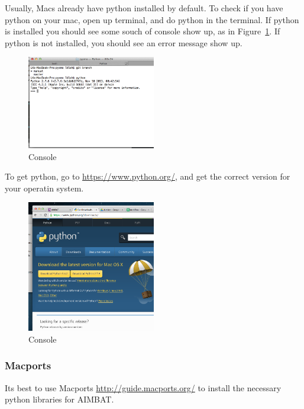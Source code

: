 \documentclass[letterpaper,10pt]{article}
\begin{document}
Usually, Macs already have python installed by default. To check if you have python on your mac,
open up terminal, and do python in the terminal. If python is installed you should see some souch of console show up, as in Figure~\ref{fig:python_console}. If python is not installed, you should see an error message show up. 

\begin{figure}[h!]
  \centering
  \includegraphics[width=0.5\textwidth]{images/python_console}
  \caption{Console}
  \label{fig:python_console}
\end{figure}

To get python, go to \url{https://www.python.org/}, and get the correct version for your operatin system. 

\begin{figure}[h!]
  \centering
  \includegraphics[width=0.5\textwidth]{images/python_version}
  \caption{Console}
  \label{fig:python_version}
\end{figure}


\subsubsection{Macports}

Its best to use Macports \url{http://guide.macports.org/} to install the necessary python libraries for AIMBAT. 
\end{document}

